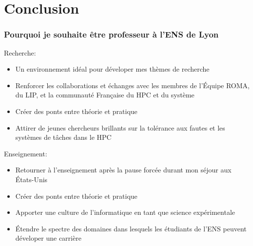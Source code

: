 \section{Conclusion}

\begin{frame}
  \frametitle{Pourquoi je souhaite \^etre professeur \`a l'ENS de Lyon}

  Recherche:
  \begin{itemize}
  \item Un environnement id\'eal pour d\'eveloper mes th\`emes de recherche
  \item Renforcer les collaborations et \'echanges avec les membres de l'\'Equipe ROMA, du LIP, et la communaut\'e Fran\c{c}aise du HPC et du syst\`eme
  \item Cr\'eer des ponts entre th\'eorie et pratique
  \item Attirer de jeunes chercheurs brillants sur la tol\'erance aux fautes et les syst\`emes de t\^aches dans le HPC
  \end{itemize}

  Enseignement:
  \begin{itemize}
  \item Retourner \`a l'enseignement apr\`es la pause forc\'ee durant mon s\'ejour aux \'Etats-Unis
  \item Cr\'eer des ponts entre th\'eorie et pratique
  \item Apporter une culture de l'informatique en tant que science exp\'erimentale
  \item \'Etendre le spectre des domaines dans lesquels les \'etudiants de l'ENS peuvent d\'eveloper une carri\`ere
  \end{itemize}
  
\end{frame}
